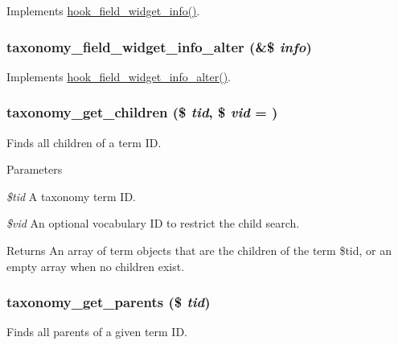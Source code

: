 \label{taxonomy_8module_ad6d45fa8106c7ee50059ebf9e89b9268}
Implements \hyperlink{group__field__widget_gac53aa6c2a4ac1215660d25b5d7f20792}{hook\_\-field\_\-widget\_\-info()}. \hypertarget{taxonomy_8module_a546dc92025f2ca5cca0311401a038c5e}{
\subsubsection[{taxonomy\_\-field\_\-widget\_\-info\_\-alter}]{\setlength{\rightskip}{0pt plus 5cm}taxonomy\_\-field\_\-widget\_\-info\_\-alter (\&\$ {\em info})}}
\label{taxonomy_8module_a546dc92025f2ca5cca0311401a038c5e}
Implements \hyperlink{group__field__widget_ga2e74ac1b4b45e9f31b58b86d01892e7e}{hook\_\-field\_\-widget\_\-info\_\-alter()}. \hypertarget{taxonomy_8module_a6de09ab81dffb762ebfc66ff7b87d80f}{
\subsubsection[{taxonomy\_\-get\_\-children}]{\setlength{\rightskip}{0pt plus 5cm}taxonomy\_\-get\_\-children (\$ {\em tid}, \/  \$ {\em vid} = {})}}
\label{taxonomy_8module_a6de09ab81dffb762ebfc66ff7b87d80f}
Finds all children of a term ID.


\begin{DoxyParams}{Parameters}
\item[{\em \$tid}]A taxonomy term ID. \item[{\em \$vid}]An optional vocabulary ID to restrict the child search.\end{DoxyParams}
\begin{DoxyReturn}{Returns}
An array of term objects that are the children of the term \$tid, or an empty array when no children exist. 
\end{DoxyReturn}
\hypertarget{taxonomy_8module_ac16465f14f3bad994d0ec7789c80223c}{
\subsubsection[{taxonomy\_\-get\_\-parents}]{\setlength{\rightskip}{0pt plus 5cm}taxonomy\_\-get\_\-parents (\$ {\em tid})}}
\label{taxonomy_8module_ac16465f14f3bad994d0ec7789c80223c}
Finds all parents of a given term ID.


